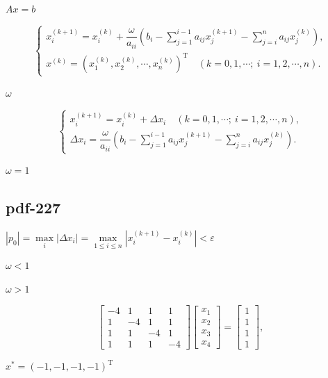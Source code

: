 \documentclass[UTF8,fontset=fandol]{ctexart}
\begin{document}
$Ax=b$\par

\[
\begin{cases}
x_i^{(k+1)}=x_i^{(k)}+\dfrac{\omega}{a_{ii}}\left(b_i-\displaystyle\sum_{j=1}^{i-1}a_{ij}x_j^{(k+1)}-\displaystyle\sum_{j=i}^n a_{ij}x_j^{(k)}\right),\\[5pt]
x^{(k)}=(x_1^{(k)},x_2^{(k)},\cdots,x_n^{(k)})^{\mathrm T}\quad(k=0,1,\cdots;\ i=1,2,\cdots,n).
\end{cases}
\tag{8.4.5}
\]

$\omega$\par

\[
\begin{cases}
x_i^{(k+1)}=x_i^{(k)}+\Delta x_i\quad(k=0,1,\cdots;\ i=1,2,\cdots,n),\\[5pt]
\Delta x_i=\dfrac{\omega}{a_{ii}}\left(b_i-\displaystyle\sum_{j=1}^{i-1}a_{ij}x_j^{(k+1)}-\displaystyle\sum_{j=i}^n a_{ij}x_j^{(k)}\right).
\end{cases}
\tag{8.4.6}
\]

$\omega=1$\par

\subsection*{pdf-227}

$|p_0|=\max\limits_i|\Delta x_i|=\max\limits_{1\leqslant i\leqslant n}|x_i^{(k+1)}-x_i^{(k)}|<\varepsilon$\par

$\omega<1$\par

$\omega>1$\par

\[
\begin{bmatrix}-4&1&1&1\\1&-4&1&1\\1&1&-4&1\\1&1&1&-4\end{bmatrix}
\begin{bmatrix}x_1\\x_2\\x_3\\x_4\end{bmatrix}
=\begin{bmatrix}1\\1\\1\\1\end{bmatrix},
\]

$x^*=(-1,-1,-1,-1)^{\mathrm T}$\par
\end{document}
